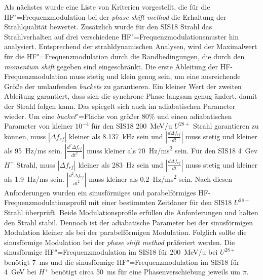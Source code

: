 Als n\"achstes wurde eine Liste von Kriterien vorgestellt, die f\"ur die HF"=Frequenzmodulation bei der \textit{phase shift method} die Erhaltung der Strahlqualit\"at bewertet. Zus\"atzlich wurde f\"ur den SIS18 Strahl das Strahlverhalten auf drei verschiedene HF"=Frequenzmodulationsmuster hin analysiert. Entsprechend der strahldynamischen Analysen, wird der Maximalwert f\"ur die HF"=Frequenzmodulation durch die Randbedingungen, die durch den \textit{momentum shift} gegeben sind eingeschr\"ankt. Die erste Ableitung der HF-Frequenzmodulation muss stetig und klein genug sein, um eine ausreichende Gr\"oße der umlaufenden \textit{buckets}  zu garantieren. Ein kleiner Wert der zweiten Ableitung garantiert,  dass sich die synchrone Phase langsam genug ändert, damit der Strahl folgen kann. Das spiegelt sich auch im adiabatischen Parameter wieder. Um eine \textit{bucket}"=Fl\"ache von größer 80$\%$  und einen adiabatischen Parameter von kleiner $10^{-4}$ f\"ur den SIS18 \SI{200}{MeV/u} $U^\mathit{28+}$ Strahl garantieren zu k\"onnen, muss $|\Delta f_{\mathit{rf}}|$ kleiner als \SI{8.137}{kHz} sein und $|\frac{d\Delta f_{\mathit{rf}}}{dt}|$ muss stetig und kleiner als \SI{95}{Hz/ms} sein. $|\frac{d^2\Delta f_{\mathit{rf}}}{dt^2}|$ muss kleiner als \SI{70}{Hz/ms^2} sein. Für den SIS18 \SI{4}{Gev} $H^{+}$ Strahl, muss $|\Delta f_{\mathit{rf}}|$ kleiner als \SI{283}{Hz} sein und $|\frac{d\Delta f_{\mathit{rf}}}{dt}|$ muss stetig und kleiner als \SI{1.9}{Hz/ms} sein. $|\frac{d^2\Delta f_{\mathit{rf}}}{dt^2}|$ muss kleiner als \SI{0.2}{Hz/ms^2} sein. Nach diesen Anforderungen wurden ein sinusförmiges und parabelförmiges HF-Frequenzmodulationsprofil mit einer bestimmten Zeitdauer f\"ur den SIS18 $U^{28+}$ Strahl \"uberpr\"uft. Beide Modulationsprofile erfüllen die Anforderungen und halten den Strahl stabil. Dennoch ist der adiabatische Parameter bei der sinusf\"ormigen Modulation kleiner als bei der parabelförmigen Modulation. Folglich sollte die sinusförmige Modulation bei der \textit{phase shift method} pr\"aferiert werden. Die sinusf\"ormige HF"=Frequenzmodulation im SIS18 f\"ur
\SI{200}{MeV/u} bei $U^\mathit{28+}$ ben\"otigt \SI{7}{\ms} und die sinusf\"ormige HF"=Frequenzmodulation im SIS18 f\"ur \SI{4}{GeV} bei $H^+$ ben\"otigt circa \SI{50}{\ms} f\"ur eine Phasenverschiebung jeweils um $\pi$.   

